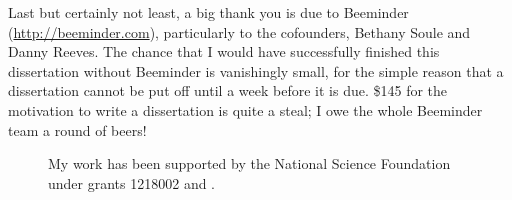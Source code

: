 Last but certainly not least, a big thank you is due to Beeminder
(\url{http://beeminder.com}), particularly to the cofounders, Bethany
Soule and Danny Reeves.  The chance that I would have successfully
finished this dissertation without Beeminder is vanishingly small, for
the simple reason that a dissertation cannot be put off until a week
before it is due.  \$145 for the motivation to write a dissertation is
quite a steal; I owe the whole Beeminder team a round of beers!


\begin{figure}[b]
\tiny\flushleft

My work has been supported by the National Science Foundation under
grants 1218002  and .
\end{figure}
